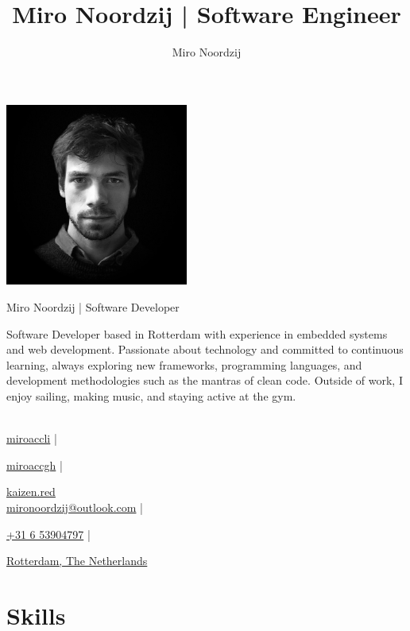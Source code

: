 \documentclass[11pt, twoside, a4paper, titlepage]{article}
\author{Miro Noordzij}
\title{Miro Noordzij | Software Engineer}
\begin{document}
\begin{tcolorbox}[boxsep=0mm, left=0mm, right=0mm, top=0mm, bottom=0mm]
	\begin{minipage}{6cm}
		\includegraphics[width=6cm, height=6cm ]{avatar.jpg}
	\end{minipage}
	\begin{minipage}{14.8cm}
		\begin{center}
			\Huge{Miro Noordzij | Software Developer}
			\vspace*{0.3cm}\\
			\small
			\parbox{14cm}{Software Developer based in Rotterdam with experience in embedded systems and web development. Passionate about technology and committed to continuous learning, always exploring new frameworks, programming languages, and development methodologies such as the mantras of clean code. Outside of work, I enjoy sailing, making music, and staying active at the gym.}
			\vspace*{0.3cm}\\
			
			\href{https://www.linkedin.com/in/miroaccli}{miroaccli} |
			
			\href{https://www.github.com/miroaccgh}{miroaccgh} |
			
			\href{https://www.kaizen.red}{kaizen.red} \\
			
			\href{mailto:mironoordzij@outlook.com}{mironoordzij@outlook.com} |
			
			\href{tel:+31653904797}{+31 6 53904797} |
			
			\href{https://g.co/kgs/Ak21VtP}{Rotterdam, The Netherlands}
		\end{center}
	\end{minipage}
\end{tcolorbox}

\section{Skills}
\end{document}
